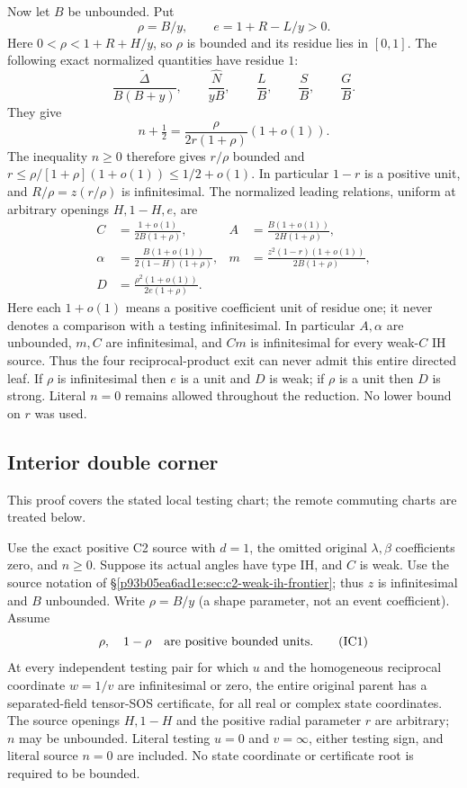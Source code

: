 Now let $B$ be unbounded. Put
\[
 \rho=B/y,\qquad e=1+R-L/y>0.
\]
Here $0<\rho<1+R+H/y$, so $\rho$ is bounded and its residue
lies in $[0,1]$. The following exact normalized quantities have
residue $1$:
\[
 \frac{\widetilde\Delta}{B(B+y)},\qquad
 \frac{\widehat N}{yB},\qquad
 \frac{L}{B},\qquad \frac{S}{B},\qquad\frac{G}{B}.
                                                        \tag{WI2}
\]
They give
\[
 n+\tfrac12=\frac{\rho}{2r(1+\rho)}(1+o(1)).
\]
The inequality $n\ge0$ therefore gives $r/\rho$ bounded and
$r\le\rho/[1+\rho](1+o(1))\le1/2+o(1)$.
In particular $1-r$ is a positive unit, and
$R/\rho=z(r/\rho)$ is infinitesimal. The normalized leading
relations, uniform at arbitrary openings $H,1-H,e$, are
\begin{align*}
 C&=\frac{1+o(1)}{2B(1+\rho)},&
 A&=\frac{B(1+o(1))}{2H(1+\rho)},\\
 \alpha&=\frac{B(1+o(1))}{2(1-H)(1+\rho)},&
 m&=\frac{z^2(1-r)(1+o(1))}{2B(1+\rho)},\\
 D&=\frac{\rho^2(1+o(1))}{2e(1+\rho)}.
                                                        \tag{WI3}
\end{align*}
Here each $1+o(1)$ means a positive coefficient unit of residue one;
it never denotes a comparison with a testing infinitesimal. In
particular $A,\alpha$ are unbounded, $m,C$ are infinitesimal, and
$Cm$ is infinitesimal for every weak-$C$ IH source. Thus the four
reciprocal-product exit can never admit this entire directed leaf.
If $\rho$ is infinitesimal then $e$ is a unit and $D$ is weak;
if $\rho$ is a unit then $D$ is strong. Literal $n=0$ remains
allowed throughout the reduction. No lower bound on $r$ was used.

\subsection{Interior double corner}
\label{component:pc00b84929b12}

\label{pc00b84929b12:sec:c2-weak-ih-interior-corner}

This proof covers the stated local testing chart; the remote commuting
charts are treated below.

\begin{theorem}
Use the exact positive C2 source with $d=1$, the omitted original
$\lambda,\beta$ coefficients zero, and $n\ge0$. Suppose its actual
angles have type IH, and $C$ is weak. Use the source notation of
\S\ref{p93b05ea6ad1e:sec:c2-weak-ih-frontier}; thus $z$ is infinitesimal and
$B$ unbounded. Write $\rho=B/y$ (a shape parameter, not an event
coefficient). Assume
\[
 \rho,\quad1-\rho
 \quad\hbox{are positive bounded units}.                 \tag{IC1}
\]
At every independent testing pair for which $u$ and the homogeneous
reciprocal coordinate $w=1/v$ are infinitesimal or zero, the entire
original parent has a separated-field tensor-SOS certificate, for
all real or complex state coordinates. The source openings $H,1-H$ and the positive radial parameter $r$
are arbitrary; $n$ may be unbounded. Literal
testing $u=0$ and $v=\infty$, either testing sign, and literal source
$n=0$ are included.
No state coordinate or certificate root is required to be bounded.
\end{theorem}

